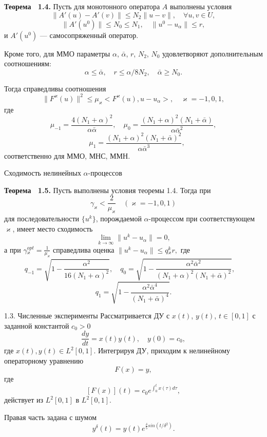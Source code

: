 \documentclass[10pt,pdf, mathserif, hyperref={unicode}]{beamer}
\begin{document}
\begin{frame}
	\begin{block}{\bf Теорема ~1.4.}
		Пусть для монотонного оператора $A$ выполнены условия $$\|A'(u)-A'(v)\|\le N_2\|u-v\|, \quad \forall u, v \in U,	$$$$\|A'(u^0)\| \le N_0\le N_1, \quad \|u^0-u_\alpha\| \le r,$$ и $A'(u^0)$ --- самосопряженный оператор. 
		
		Кроме того, для ММО параметры $\alpha$, $\bar\alpha$, $r$, $N_2$, $N_0$ удовлетворяют дополнительным соотношениям:
		$$\alpha \le \bar\alpha, \quad r\le \alpha/8N_2, \quad \bar\alpha \ge N_0.$$
		
		Тогда справедливы соотношения
		$$\|F^\varkappa(u)\|^2 \le \mu_\varkappa<F^\varkappa(u), u-u_\alpha>, \quad \varkappa=-1,0,1,$$ где
		$$
		\mu _{-1}=\frac{4(N_1+\alpha)^2}{\alpha\bar\alpha}, \quad \mu _0= \frac{(N_1+\alpha)^2(N_1+\bar\alpha)}{\alpha{\bar\alpha}^2}, $$$$\quad \mu_1= \frac{(N_1+\alpha)^2(N_1+\bar\alpha)^2}{\alpha{\bar\alpha}^3},
		$$
		соответственно для ММО, МНС, ММН.
	\end{block}
\end{frame}
\begin{frame}{\small Сходимость нелинейных $\alpha$-процессов}
	\begin{block}{\bf Теорема ~1.5.}
		Пусть выполнены условия теоремы 1.4. Тогда при
		$$\gamma _\varkappa <\frac{2}{\mu _\varkappa}\quad (\varkappa=-1,0,1)$$
		для последовательности $\{u^k\}$, порождаемой $\alpha$-процессом при соответствующем $\varkappa$, имеет место сходимость $$\lim_{k\to\infty}\|u^k-u_\alpha\|=0, $$ а при 
		$\gamma{_\varkappa^{opt}}=\frac{1}{\mu_\varkappa}$
		справедлива оценка $\|u^k-u_\alpha\|\le q{_\varkappa^k}r,$ где
		$$
		q_{-1}=\sqrt{1-\frac{\alpha^2}{16(N_1+\alpha)^2}}, \quad q_0=\sqrt{1-\frac{\alpha^2\bar\alpha^2}{(N_1+\alpha)^2(N_1+\bar\alpha)^2}}, \quad $$$$q_1=\sqrt{1-\frac{\alpha^2\bar\alpha^4}{(N_1+\bar\alpha)^4}}.
		$$
	\end{block}
\end{frame}
\begin{frame}{1.3. Численные эксперименты}
	Рассматривается ДУ с $x(t)$, $y(t)$, $t\in[0, 1]$ с заданной константой $c_0>0$
	$$	\frac{dy}{dt}=x(t)y(t), \quad y(0)=c_0,$$
	где $x(t), y(t)\in L^2[0,1]$. Интегрируя ДУ, приходим к нелинейному операторному уравнению
	$$	F(x)=y,$$
	где $$[F(x)](t)=c_0 e^{\int_{0}^{t}x(\tau)d\tau},$$
	действует из $L^2[0,1]$ в $L^2[0,1]$. 
	
	Правая часть задана с шумом $$y^\delta(t)=y(t)e^{\frac{\delta}{5} sin(t/{\delta}^2)}.$$

	\let\thefootnote\relax\let\thefootnote\relax{}
\end{frame}
\end{document}
